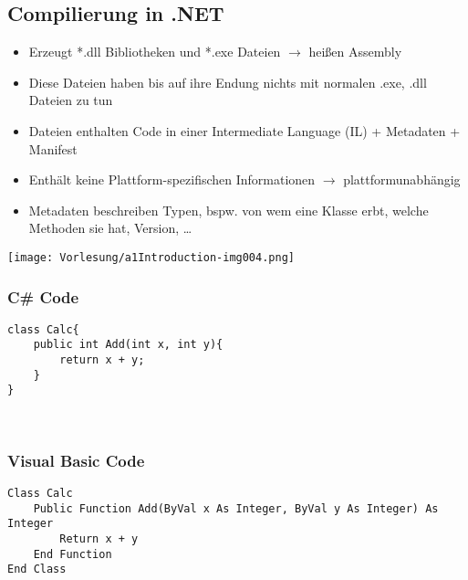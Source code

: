 
\subsection{Compilierung in .NET}

\begin{itemize}
\item Erzeugt *.dll Bibliotheken und *.exe Dateien $\to$ heißen Assembly
\item Diese Dateien haben bis auf ihre Endung nichts mit normalen .exe, .dll Dateien zu tun
\item Dateien enthalten Code in einer Intermediate Language (IL) + Metadaten + Manifest
\item Enthält keine Plattform-spezifischen Informationen $\to$ plattformunabhängig
\item Metadaten beschreiben Typen, bspw. von wem eine Klasse erbt, welche Methoden sie hat, Version, …
\end{itemize}
\begin{center}
\texttt{[image: Vorlesung/a1Introduction-img004.png]} 
\end{center}

\subsubsection{C\# Code}

\begin{lstlisting}[language={[Sharp]C}]
class Calc{
	public int Add(int x, int y){
		return x + y;
	}
}
\end{lstlisting}

~

\subsubsection{Visual Basic Code}

\begin{lstlisting}[language={[Visual]Basic}]
Class Calc
	Public Function Add(ByVal x As Integer, ByVal y As Integer) As Integer
		Return x + y
	End Function
End Class
\end{lstlisting}


